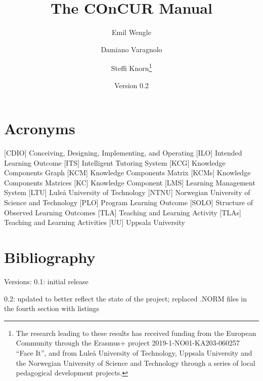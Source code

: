 \def\Version{0.2}

%
\title{The COnCUR Manual}
\date{Version \Version} %
\author{Emil Wengle \and Damiano Varagnolo \and Steffi Knorn\footnote{The research leading to these results has received funding from the European Community through the Erasmus+ project 2019-1-NO01-KA203-060257 ``Face It'', and from Lule{\aa} University of Technology, Uppsala University and the Norwegian University of Science and Technology through a series of local pedagogical development projects.}}
%

\maketitle
\tableofcontents
\newpage

\section*{Acronyms}
\begin{acronym}
				[CDIO]	{Conceiving, Designing, Implementing, and Operating}
				[ILO]	{Intended Learning Outcome}
				[ITS]	{Intelligent Tutoring System}
				[KCG]	{Knowledge Components Graph}
				[KCM]	{Knowledge Components Matrix}
		[KCMs]	{Knowledge Components Matrices}
				[KC]	{Knowledge Component}
				[LMS]	{Learning Management System}
				[LTU]	{Lule{\aa} University of Technology}
				[NTNU]	{Norwegian University of Science and Technology}
				[PLO]	{Program Learning Outcome}
				[SOLO]	{Structure of Observed Learning Outcomes}
				[TLA]	{Teaching and Learning Activity}
		[TLAs]	{Teaching and Learning Activities}
				[UU]	{Uppsala University}
\end{acronym}
\newpage







\appendix
\newpage








\section{Bibliography}




Versions:
0.1: initial release

0.2: updated to better reflect the state of the project; replaced .NORM files in the fourth section with listings

